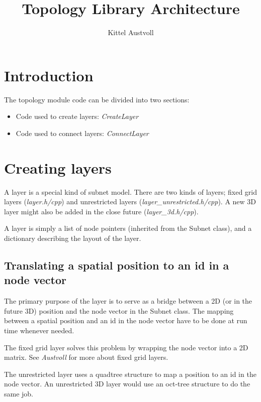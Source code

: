 \documentclass{article}
\title{Topology Library Architecture}
\author{Kittel Austvoll}
\begin{document}
\maketitle 

\tableofcontents

\section{Introduction}

The topology module code can be divided into two sections:

\begin{itemize}
\item Code used to create layers: \emph{CreateLayer}
\item Code used to connect layers: \emph{ConnectLayer}
\end{itemize}

\section{Creating layers}

A layer is a special kind of subnet model. There are two kinds of layers; fixed grid layers (\emph{layer.h/cpp}) and unrestricted layers (\emph{layer\_unrestricted.h/cpp}). A new 3D layer might also be added in the close future (\emph{layer\_3d.h/cpp}).

A layer is simply a list of node pointers (inherited from the Subnet class), and a dictionary describing the layout of the layer. 

\subsection{Translating a spatial position to an id in a node vector}

The primary purpose of the layer is to serve as a bridge between a 2D (or in the future 3D) position and the node vector in the Subnet class. The mapping between a spatial position and an id in the node vector have to be done at run time whenever needed.

The fixed grid layer solves this problem by wrapping the node vector into a 2D matrix. See \emph{Austvoll}\cite{austvoll} for more about fixed grid layers.

The unrestricted layer uses a quadtree structure to map a position to an id in the node vector. An unrestricted 3D layer would use an oct-tree structure to do the same job.
\end{document}
